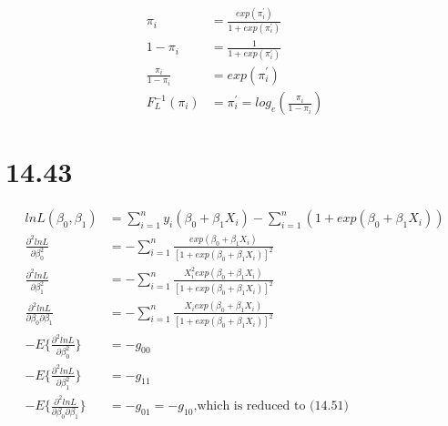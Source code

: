 \documentclass{article}\usepackage[]{graphicx}\usepackage[]{color}
\begin{document}
\begin{displaymath}
\begin{split}
  \pi_i &= \frac{exp(\pi_i^{'})}{1+exp(\pi_i^{'})} \\
  1-\pi_i &= \frac{1}{1+exp(\pi_i^{'})} \\
  \frac{\pi_i}{1-\pi_i} &= exp(\pi_i^{'}) \\
  F_L^{-1}(\pi_i) &= \pi_i^{'} =  log_e( \frac{\pi_i}{1-\pi_i})
\end{split}
\end{displaymath}

\section{14.43}

\begin{displaymath}
\begin{split}
  lnL(\beta_0, \beta_1) &= \sum_{i=1}^n y_i(\beta_0+\beta_1 X_i) - \sum_{i=1}^n(1+exp(\beta_0+\beta_1 X_i))\\
  \frac{\partial^2 lnL}{\partial \beta_0^2} &= - \sum_{i=1}^n \frac{exp(\beta_0+\beta_1 X_i)}{[1+exp(\beta_0+\beta_1 X_i)]^2}\\
  \frac{\partial^2 lnL}{\partial \beta_1^2} &= - \sum_{i=1}^n \frac{X_i^2 exp(\beta_0+\beta_1 X_i)}{[1+exp(\beta_0+\beta_1 X_i)]^2}\\
  \frac{\partial^2 lnL}{\partial \beta_0 \partial \beta_1} &= - \sum_{i=1}^n \frac{X_i exp(\beta_0+\beta_1 X_i)}{[1+exp(\beta_0+\beta_1 X_i)]^2}\\
  -E\{ \frac{\partial^2 lnL}{\partial \beta_0^2} \} &= -g_{00}\\
  -E\{ \frac{\partial^2 lnL}{\partial \beta_1^2} \} &= -g_{11}\\
  -E\{ \frac{\partial^2 lnL}{\partial \beta_0 \partial \beta_1} \} &= -g_{01} = -g_{10}
  \text{,which is reduced to (14.51)}\\
\end{split}
\end{displaymath}
\end{document}
